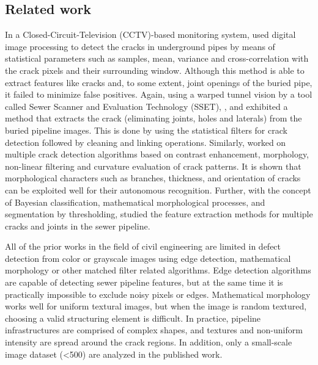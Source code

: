 \documentclass[letterpaper,12pt, onecolumn]{article}%
\begin{document}
\subsection{Related work}
\noindent
In a Closed-Circuit-Television (CCTV)-based monitoring system, \cite{fieguths99} used digital image processing to detect the cracks in underground pipes by means of statistical parameters such as samples, mean, variance and cross-correlation with the crack pixels and their surrounding window. Although this method is able to extract features like cracks and, to some extent, joint openings of the buried pipe, it failed to minimize false positives. Again, using a warped tunnel vision by a tool called Sewer Scanner and Evaluation Technology (SSET), \cite{iseley}, \cite{Sinha200658} and \cite{iyer2013automated} exhibited a method that extracts the crack (eliminating joints, holes and laterals) from the buried pipeline images. This is done by using the statistical filters for crack detection followed by cleaning and linking operations. Similarly, \cite{iyer_shiva} worked on multiple crack detection algorithms based on contrast enhancement, morphology, non-linear filtering and curvature evaluation of crack patterns. It is shown that morphological characters such as branches, thickness, and orientation of cracks can be exploited well for their autonomous recognition. Further, with the concept of Bayesian classification, mathematical morphological processes, and segmentation by thresholding, \cite{Sinha200647} studied the feature extraction methods for multiple cracks and joints in the sewer pipeline.

All of the prior works in the field of civil engineering are limited in defect detection from color or grayscale images using edge detection, mathematical morphology or other matched filter related algorithms. Edge detection algorithms are capable of detecting sewer pipeline features, but at the same time it is practically impossible to exclude noisy pixels or edges. Mathematical morphology works well for uniform textural images, but when the image is random textured, choosing a valid structuring element is difficult. In practice, pipeline infrastructures are comprised of complex shapes, and textures and non-uniform intensity are spread around the crack regions. In addition, only a small-scale image dataset (<500) are analyzed in the published work. 
\end{document}
